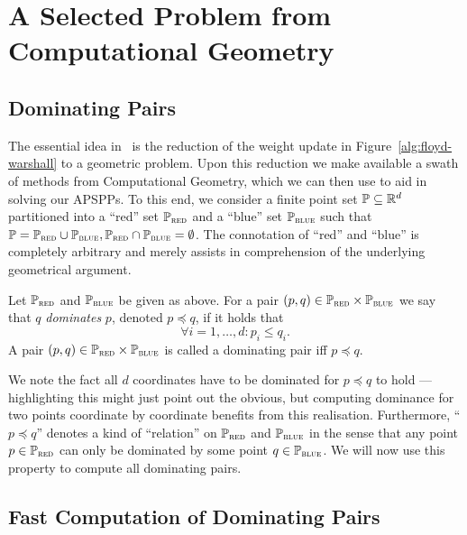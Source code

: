 \chapter{A Selected Problem from Computational Geometry}\label{chap:computational-geometry}

\section{Dominating Pairs}

The essential idea in~\cite{Chan2007} is the reduction of the weight update in Figure~\ref{alg:floyd-warshall} to a geometric problem.
Upon this reduction we make available a swath of methods from Computational Geometry, which we can then use to aid in solving our APSPPs.
To this end, we consider a finite point set $\mathbb{P} \subseteq \mathbb{R}^d$ partitioned into a ``red'' set $\mathbb{P}_{\textsc{red}}$ and a ``blue'' set $\mathbb{P}_{\textsc{blue}}$ such that $\mathbb{P} = \mathbb{P}_{\textsc{red}} \cup \mathbb{P}_{\textsc{blue}}, \mathbb{P}_{\textsc{red}} \cap \mathbb{P}_{\textsc{blue}} = \emptyset$.
The connotation of ``red'' and ``blue'' is completely arbitrary and merely assists in comprehension of the underlying geometrical argument.

\begin{definition}
    Let $\mathbb{P}_{\textsc{red}}$ and $\mathbb{P}_{\textsc{blue}}$ be given as above. For a pair $(p, q) \in \mathbb{P}_{\textsc{red}} \times \mathbb{P}_{\textsc{blue}}$ we say that $q$ \emph{dominates} $p$, denoted $p \preccurlyeq q$, if it holds that
    \[
        \forall i = 1, \dots, d: p_i \leq q_i.
    \]
    A pair $(p, q) \in \mathbb{P}_{\textsc{red}} \times \mathbb{P}_{\textsc{blue}}$ is called a dominating pair iff $p \preccurlyeq q$.
\end{definition}

We note the fact all $d$ coordinates have to be dominated for $p \preccurlyeq q$ to hold --- highlighting this might just point out the obvious, but computing dominance for two points coordinate by coordinate benefits from this realisation.
Furthermore, ``$p \preccurlyeq q$'' denotes a kind of ``relation'' on $\mathbb{P}_{\textsc{red}}$ and $\mathbb{P}_{\textsc{blue}}$ in the sense that any point $p \in \mathbb{P}_{\textsc{red}}$ can only be dominated by some point $q \in \mathbb{P}_{\textsc{blue}}$.
We will now use this property to compute all dominating pairs.

\section{Fast Computation of Dominating Pairs}

